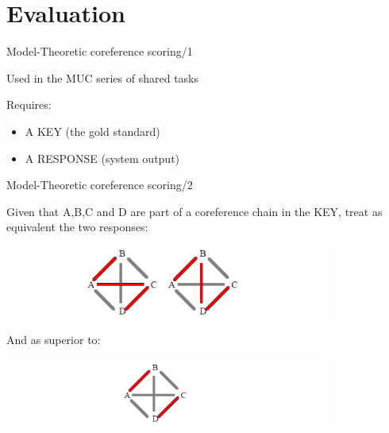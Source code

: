 \documentclass[dvipsnames, 10pt, compress]{beamer}
\begin{document}
\section{Evaluation}


\begin{frame}{Model-Theoretic coreference scoring/1}

Used in the MUC series of shared tasks

Requires:
\begin{itemize}
  \item A KEY (the gold standard)
  \item A RESPONSE (system output)
\end{itemize} 

\end{frame}

\begin{frame}{Model-Theoretic coreference scoring/2}

Given that A,B,C and D are part of a coreference 
chain in the KEY, treat as equivalent the two 
responses: 
\begin{center}
\includegraphics[width=0.8\textwidth]{graphics/coref-eval-1.png}
\end{center}

And as superior to: 
\begin{center}
\includegraphics[width=0.8\textwidth]{graphics/coref-eval-2.png}
\end{center}
\end{frame}
\end{document}
